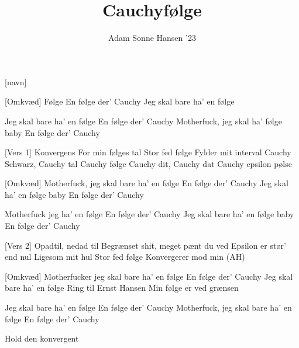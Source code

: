 \documentclass[a4paper,11pt]{article}
\title{Cauchyfølge}
\author{Adam Sonne Hansen '23}
\begin{document}
\maketitle

\begin{roles}
[navn]
\end{roles}
\begin{song}
  \sings{}[Omkvæd]
Følge
En følge der' Cauchy
Jeg skal bare ha' en følge

Jeg skal bare ha' en følge
En følge der' Cauchy
Motherfuck, jeg skal ha' følge baby
En følge der' Cauchy

\sings{}[Vers 1]
Konvergens
For min følges tal
Stor fed følge
Fylder mit interval
Cauchy Schwarz, Cauchy tal
Cauchy følge
Cauchy dit, Cauchy dat
Cauchy epsilon pølse



\sings{}[Omkvæd]
Motherfuck, jeg skal bare ha' en følge
En følge der' Cauchy
Jeg skal ha' en følge baby
En følge der' Cauchy

Motherfuck jeg ha' en følge
En følge der' Cauchy
Jeg skal bare ha' en følge baby
En følge der' Cauchy

\sings{}[Vers 2]
Opadtil, nedad til
Begrænset shit, meget pænt du ved
Epsilon er stør' end nul
Ligesom mit hul
Stor fed følge
Konvergerer mod min (AH)

\sings{}[Omkvæd]
Motherfucker jeg skal bare ha' en følge
En følge der' Cauchy
Jeg skal bare ha' en følge
Ring til Ernst Hansen
Min følge er ved grænsen

Jeg skal bare ha' en følge
En følge der' Cauchy
Motherfuck, jeg skal bare ha' en følge 
En følge der' Cauchy

Hold den konvergent
\end{song}
\end{document}
